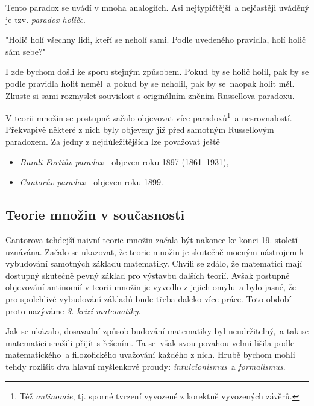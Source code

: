 Tento paradox se uvádí v mnoha analogiích. Asi nejtypičtější~a nejčastěji uváděný je tzv. \emph{paradox holiče}.

"Holič holí všechny lidi, kteří se neholí sami. Podle uvedeného pravidla, holí holič sám sebe?"

I zde bychom došli ke sporu stejným způsobem. Pokud by se holič holil, pak by se podle pravidla holit neměl~a pokud by se neholil, pak by se~naopak holit měl. Zkuste si sami rozmyslet souvislost s originálním zněním Russellova paradoxu.\par
V teorii množin se postupně začalo objevovat více paradoxů\footnote{Též \emph{antinomie}, tj. sporné tvrzení vyvozené z korektně vyvozených závěrů.}~a nesrovnalostí. Překvapivě některé z nich byly objeveny již před samotným Russellovým paradoxem. Za jedny z nejdůležitějších lze považovat ještě
\begin{itemize}
\item \emph{Burali-Fortiův paradox} - objeven roku 1897  (1861--1931),
\item \emph{Cantorův paradox} - objeven roku 1899.
\end{itemize}
\subsection{Teorie množin v současnosti}
\label{subsec:tm_soucasnost}
Cantorova tehdejší naivní teorie množin začala být nakonec ke konci 19. století uznávána. Začalo se ukazovat, že teorie množin je skutečně mocným nástrojem k vybudování samotných základů matematiky. Chvíli se zdálo, že matematici mají dostupný skutečně pevný základ pro výstavbu dalších teorií. Avšak postupné objevování antinomií v teorii množin je vyvedlo z jejich omylu~a bylo jasné, že pro spolehlivé vybudování základů bude třeba daleko více práce. Toto období proto nazýváme \emph{3. krizí matematiky}.\par
Jak se ukázalo, dosavadní způsob budování matematiky byl neudržitelný,~a tak se matematici snažili přijít s řešením. Ta se~však svou povahou velmi lišila podle matematického~a filozofického uvažování každého z nich. Hrubě bychom mohli tehdy rozlišit dva hlavní myšlenkové proudy: \emph{intuicionismus}~a \emph{formalismus}.

